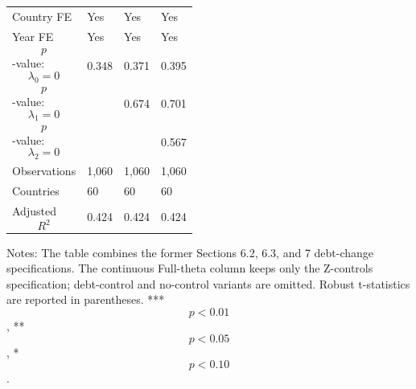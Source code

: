 \begin{table}[H]
\begin{threeparttable}
\begin{tabularx}{\textwidth}{lYYY}
Country FE & Yes & Yes & Yes \\
Year FE & Yes & Yes & Yes \\
$$p$$-value: $$\lambda_0=0$$ & 0.348 & 0.371 & 0.395 \\
$$p$$-value: $$\lambda_1=0$$ &  & 0.674 & 0.701 \\
$$p$$-value: $$\lambda_2=0$$ &  &  & 0.567 \\
Observations & 1,060 & 1,060 & 1,060 \\
Countries & 60 & 60 & 60 \\
Adjusted $$R^2$$ & 0.424 & 0.424 & 0.424 \\
\bottomrule
\end{tabularx}
\begin{tablenotes}[flushleft]\footnotesize
\item Notes: The table combines the former Sections 6.2, 6.3, and 7 debt-change specifications. The continuous Full-theta column keeps only the Z-controls specification; debt-control and no-control variants are omitted. Robust t-statistics are reported in parentheses. *** $$p<0.01$$, ** $$p<0.05$$, * $$p<0.10$$.
\end{tablenotes}
\end{threeparttable}
\end{table}
